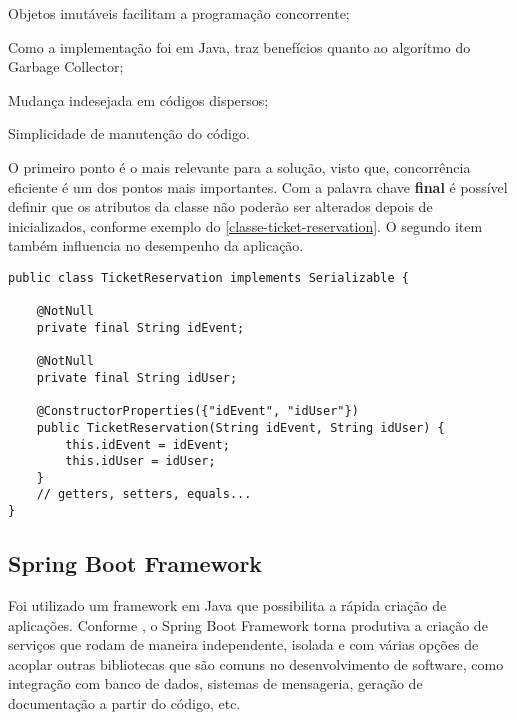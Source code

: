 \begin{alineas}

  \item Objetos imutáveis facilitam a programação concorrente;

  \item Como a implementação foi em Java, traz benefícios quanto ao algorítmo do
        Garbage Collector;

  \item Mudança indesejada em códigos dispersos;

  \item Simplicidade de manutenção do código.

\end{alineas}


O primeiro ponto é o mais relevante para a solução, visto que, concorrência
eficiente é um dos pontos mais importantes. Com a palavra chave \textbf{final} é
possível definir que os atributos da classe não poderão ser alterados depois
de inicializados, conforme exemplo do \autoref{classe-ticket-reservation}. O
segundo item também influencia no desempenho da aplicação.

\begin{lstlisting}[label=classe-ticket-reservation,caption=Classe TicketReservation em Java]
public class TicketReservation implements Serializable {

    @NotNull
    private final String idEvent;

    @NotNull
    private final String idUser;

    @ConstructorProperties({"idEvent", "idUser"})
    public TicketReservation(String idEvent, String idUser) {
        this.idEvent = idEvent;
        this.idUser = idUser;
    }
    // getters, setters, equals...
}
\end{lstlisting}

\subsection{Spring Boot Framework}

Foi utilizado um framework em Java que possibilita a rápida criação de aplicações.
Conforme \cite[8]{spring-boot-reference-guide}, o Spring Boot Framework torna
produtiva a criação de serviços que rodam de maneira independente, isolada
e com várias opções de acoplar outras bibliotecas que são comuns no desenvolvimento
de software, como integração com banco de dados, sistemas de mensageria, geração
de documentação a partir do código, etc.

